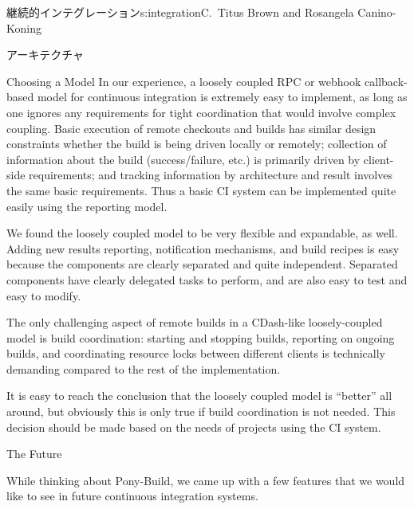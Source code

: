 \begin{aosachapter}{継続的インテグレーション}{s:integration}{C.\ Titus Brown and Rosangela Canino-Koning}
\begin{aosasect1}{アーキテクチャ}
\begin{aosasect2}{Choosing a Model}
In our experience, a loosely coupled RPC or webhook callback-based
model for continuous integration is extremely easy to implement, as
long as one ignores any requirements for tight coordination that would
involve complex coupling. Basic execution of remote checkouts and
builds has similar design constraints whether the build is being
driven locally or remotely; collection of information about the build
(success/failure, etc.) is primarily driven by client-side
requirements; and tracking information by architecture and result
involves the same basic requirements.  Thus a basic CI system can be
implemented quite easily using the reporting model.

We found the loosely coupled model to be very flexible and expandable,
as well. Adding new results reporting, notification mechanisms, and
build recipes is easy because the components are clearly separated and
quite independent. Separated components have clearly delegated tasks
to perform, and are also easy to test and easy to modify.

The only challenging aspect of remote builds in a CDash-like
loosely-coupled model is build coordination: starting and stopping
builds, reporting on ongoing builds, and coordinating resource locks
between different clients is technically demanding compared to the
rest of the implementation.

It is easy to reach the conclusion that the loosely coupled model is
``better'' all around, but obviously this is only true if build
coordination is not needed.  This decision should be made based on the
needs of projects using the CI system.

\end{aosasect2}

\end{aosasect1}

\begin{aosasect1}{The Future}

While thinking about Pony-Build, we came up with a few features that
we would like to see in future continuous integration systems.

\begin{aosadescription}


\end{aosadescription}
\end{aosasect1}
\end{aosachapter}
